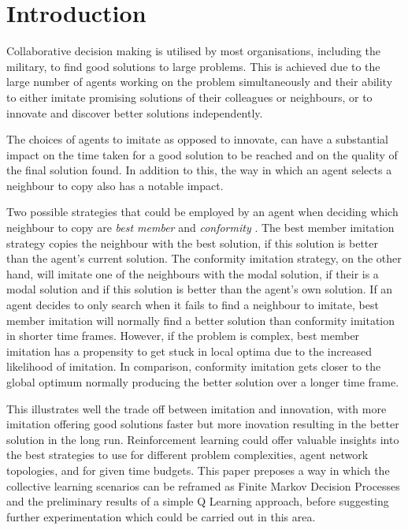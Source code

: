 \documentclass[conference]{IEEEtran}
\begin{document}
\section{Introduction}\label{intro}
Collaborative decision making is utilised by most organisations,
including the military,
to find good solutions to large problems.
This is achieved due
to the large number of agents working on the problem simultaneously
and their ability to either
imitate promising solutions of their colleagues or neighbours,
or to innovate and discover better solutions independently.

The choices of agents to imitate as opposed to innovate,
can have a substantial impact on the time taken
for a good solution to be reached
and on the quality of the final solution found.
In addition to this,
the way in which an agent selects a neighbour to copy
also has a notable impact.

Two possible strategies that could be employed by an agent when deciding
which neighbour to copy are \emph{best member} and \emph{conformity}
\cite{sociallearning}.
The best member imitation strategy
copies the neighbour with the best solution,
if this solution is better than the agent's current solution.
The conformity imitation strategy, on the other hand,
will imitate one of the neighbours with the modal solution,
if their is a modal solution
and if this solution is better than the agent's own solution.
If an agent decides to only search when it fails to find a neighbour to imitate,
best member imitation will normally find a better solution than
conformity imitation in shorter time frames.
However, if the problem is complex,
best member imitation has a propensity to get stuck in local optima
due to the increased likelihood of imitation.
In comparison, conformity imitation gets closer to the global optimum
normally producing the better solution over a longer time frame.


This illustrates well the trade off between imitation and innovation,
with more imitation offering good solutions faster
but more inovation resulting in the better solution in the long run.
Reinforcement learning could offer valuable insights
into the best strategies to use for different problem complexities,
agent network topologies, and for given time budgets.
This paper preposes a way in which the collective learning scenarios
can be reframed as Finite Markov Decision Processes
and the preliminary results of a simple Q Learning approach,
before suggesting further experimentation
which could be carried out in this area.
\end{document}

